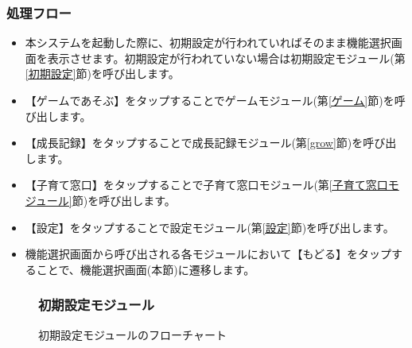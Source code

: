 \documentclass[a4j]{jarticle}
\begin{document}
\subsubsection*{処理フロー}
\begin{itemize}
\item 本システムを起動した際に、初期設定が行われていればそのまま機能選択画面を表示させます。初期設定が行われていない場合は初期設定モジュール(第\ref{初期設定}節)を呼び出します。

\item 【ゲームであそぶ】をタップすることでゲームモジュール(第\ref{ゲーム}節)を呼び出します。

\item 【成長記録】をタップすることで成長記録モジュール(第\ref{grow}節)を呼び出します。

\item 【子育て窓口】をタップすることで子育て窓口モジュール(第\ref{子育て窓口モジュール}節)を呼び出します。

\item 【設定】をタップすることで設定モジュール(第\ref{設定}節)を呼び出します。

\item 機能選択画面から呼び出される各モジュールにおいて【もどる】をタップすることで、機能選択画面(本節)に遷移します。
\end{itemize}

\begin{figure}[H]
\subsubsection{初期設定モジュール\label{初期設定}}
    \begin{center}
    \caption {初期設定モジュールのフローチャート}
    \label{initialsetting}
    \end{center}
\end{figure}
\end{document}
